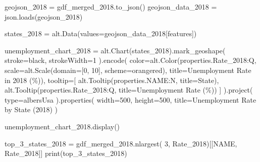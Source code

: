 \documentclass[
  letterpaper,
  DIV=11,
  numbers=noendperiod]{scrartcl}
\newenvironment{Shaded}{\begin{snugshade}}{\end{snugshade}}
\newcommand{\BuiltInTok}[1]{\textcolor[rgb]{0.00,0.23,0.31}{#1}}
\newcommand{\DecValTok}[1]{\textcolor[rgb]{0.68,0.00,0.00}{#1}}
\newcommand{\NormalTok}[1]{\textcolor[rgb]{0.00,0.23,0.31}{#1}}
\newcommand{\OperatorTok}[1]{\textcolor[rgb]{0.37,0.37,0.37}{#1}}
\newcommand{\StringTok}[1]{\textcolor[rgb]{0.13,0.47,0.30}{#1}}
\begin{document}
\begin{Shaded}
\begin{Highlighting}[]
\NormalTok{geojson\_2018 }\OperatorTok{=}\NormalTok{ gdf\_merged\_2018.to\_json()}
\NormalTok{geojson\_data\_2018 }\OperatorTok{=}\NormalTok{ json.loads(geojson\_2018)}

\NormalTok{states\_2018 }\OperatorTok{=}\NormalTok{ alt.Data(values}\OperatorTok{=}\NormalTok{geojson\_data\_2018[}\StringTok{\textquotesingle{}features\textquotesingle{}}\NormalTok{])}

\NormalTok{unemployment\_chart\_2018 }\OperatorTok{=}\NormalTok{ alt.Chart(states\_2018).mark\_geoshape(}
\NormalTok{    stroke}\OperatorTok{=}\StringTok{\textquotesingle{}black\textquotesingle{}}\NormalTok{,}
\NormalTok{    strokeWidth}\OperatorTok{=}\DecValTok{1}
\NormalTok{).encode(}
\NormalTok{    color}\OperatorTok{=}\NormalTok{alt.Color(}\StringTok{\textquotesingle{}properties.Rate\_2018:Q\textquotesingle{}}\NormalTok{,}
\NormalTok{                    scale}\OperatorTok{=}\NormalTok{alt.Scale(domain}\OperatorTok{=}\NormalTok{[}\DecValTok{0}\NormalTok{, }\DecValTok{10}\NormalTok{], scheme}\OperatorTok{=}\StringTok{\textquotesingle{}orangered\textquotesingle{}}\NormalTok{),}
\NormalTok{                    title}\OperatorTok{=}\StringTok{\textquotesingle{}Unemployment Rate in 2018 (\%)\textquotesingle{}}\NormalTok{),}
\NormalTok{    tooltip}\OperatorTok{=}\NormalTok{[}
\NormalTok{        alt.Tooltip(}\StringTok{\textquotesingle{}properties.NAME:N\textquotesingle{}}\NormalTok{, title}\OperatorTok{=}\StringTok{\textquotesingle{}State\textquotesingle{}}\NormalTok{),}
\NormalTok{        alt.Tooltip(}\StringTok{\textquotesingle{}properties.Rate\_2018:Q\textquotesingle{}}\NormalTok{, title}\OperatorTok{=}\StringTok{\textquotesingle{}Unemployment Rate (\%)\textquotesingle{}}\NormalTok{)}
\NormalTok{    ]}
\NormalTok{).project(}
    \BuiltInTok{type}\OperatorTok{=}\StringTok{\textquotesingle{}albersUsa\textquotesingle{}}
\NormalTok{).properties(}
\NormalTok{    width}\OperatorTok{=}\DecValTok{500}\NormalTok{,}
\NormalTok{    height}\OperatorTok{=}\DecValTok{500}\NormalTok{,}
\NormalTok{    title}\OperatorTok{=}\StringTok{\textquotesingle{}Unemployment Rate by State (2018)\textquotesingle{}}
\NormalTok{)}

\NormalTok{unemployment\_chart\_2018.display()}

\NormalTok{top\_3\_states\_2018 }\OperatorTok{=}\NormalTok{ gdf\_merged\_2018.nlargest(}
    \DecValTok{3}\NormalTok{, }\StringTok{\textquotesingle{}Rate\_2018\textquotesingle{}}\NormalTok{)[[}\StringTok{\textquotesingle{}NAME\textquotesingle{}}\NormalTok{, }\StringTok{\textquotesingle{}Rate\_2018\textquotesingle{}}\NormalTok{]]}
\BuiltInTok{print}\NormalTok{(top\_3\_states\_2018)}
\end{Highlighting}
\end{Shaded}
\end{document}
